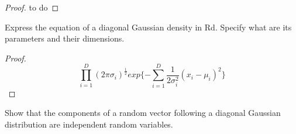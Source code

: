 \documentclass[12pt]{article}
\newenvironment{problem}[2][Problem]{\begin{trivlist}
\item[\hskip \labelsep {\bfseries #1}\hskip \labelsep {\bfseries #2.}]}{\end{trivlist}}
\begin{document}
\begin{proof}
to do
\end{proof}


\begin{problem}{3.4 (a)}
Express the equation of a diagonal Gaussian density in Rd. Specify what are its parameters and their dimensions.
\end{problem}

\begin{proof}
\begin{equation*}
\prod_{i=1}^{D} (2\pi \sigma_{i})^{\frac{1}{2}} exp\{{- \sum_{i=1}^{D}} \frac{1}{2 \sigma_{i} ^2} (x_{i} - \mu_{i})^2 \} 
\end{equation*}
\end{proof}


\begin{problem}{3.4 (b)}
Show that the components of a random vector following a diagonal Gaussian distribution are independent random variables.
\end{problem}
\end{document}
